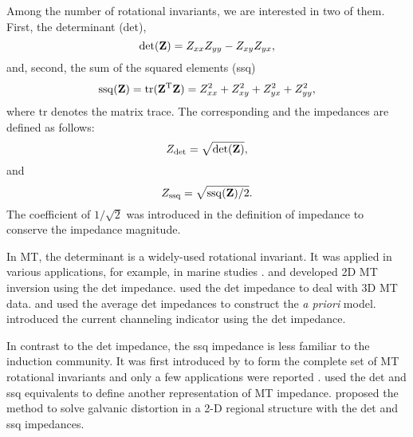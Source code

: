 		Among the number of rotational invariants, we are interested in two of them. 
		First, the determinant (det), 
		\begin{equation}
			\mathrm{det}(\mathbf{Z}) = Z_{xx}Z_{yy}-Z_{xy}Z_{yx}, 
		\end{equation}
		and, second, the sum of the squared elements (ssq)
		\begin{equation}
			\mathrm{ssq}(\mathbf{Z}) = \mathrm{tr}({\mathbf{Z}}^\text{T}\mathbf{Z}) =  Z_{xx}^2 + Z_{xy}^2 + Z_{yx}^2 + Z_{yy}^2,
		\end{equation}
		where $\mathrm{tr}$ denotes the matrix trace. 
		The corresponding {\det} and the {\ssq} impedances are defined as follows:
		\begin{equation} \label{eq:zdet_def}
			\Zdet = \sqrt{\det(\Zbf)}, 
		\end{equation}
		and
		\begin{equation}\label{eq:zssq_def}
			\Zssq = \sqrt{\ssq(\Zbf)/2}.
		\end{equation}
		The coefficient of $1/\sqrt{2}$ was introduced in the definition of {\ssq} impedance to conserve the impedance magnitude. 
		
		In MT, the determinant is a widely-used rotational invariant.
		It was applied in various applications, for example, in marine studies \citep[e.g.,][]{seama2007a, baba2010a, yang2010a}.
		\citet{oldenburg1993a} and \citet{pedersen2005a} developed 2D MT inversion using the det impedance.
		\citet{arango2009a} used the det impedance to deal with 3D MT data. 
		\citet{tournerie2002a} and \citet{avdeeva2015a} used the average det impedances to construct the \emph{a priori} model.
		\citet{lezaeta2003a} introduced the current channeling indicator using the det impedance.
				
		In contrast to the det impedance, the ssq impedance is less familiar to the induction community. 
		It was first introduced by \citet{szarka1997a} to form the complete set of MT rotational invariants and only a few applications were reported \citep[e.g.,][]{szarka2000a, szarka2005a}.
		\citet{romo2005a} used the det and ssq equivalents to define another representation of MT impedance. \citet{gomez-trevino2014a} proposed the method to solve galvanic distortion in a 2-D regional structure with the det and ssq impedances.
	
	
	
	
